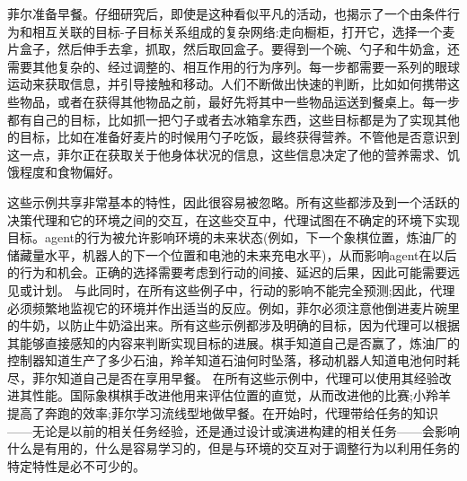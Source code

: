 菲尔准备早餐。仔细研究后，即使是这种看似平凡的活动，也揭示了一个由条件行为和相互关联的目标-子目标关系组成的复杂网络:走向橱柜，打开它，选择一个麦片盒子，然后伸手去拿，抓取，然后取回盒子。要得到一个碗、勺子和牛奶盒，还需要其他复杂的、经过调整的、相互作用的行为序列。每一步都需要一系列的眼球运动来获取信息，并引导接触和移动。人们不断做出快速的判断，比如如何携带这些物品，或者在获得其他物品之前，最好先将其中一些物品运送到餐桌上。每一步都有自己的目标，比如抓一把勺子或者去冰箱拿东西，这些目标都是为了实现其他的目标，比如在准备好麦片的时候用勺子吃饭，最终获得营养。不管他是否意识到这一点，菲尔正在获取关于他身体状况的信息，这些信息决定了他的营养需求、饥饿程度和食物偏好。

这些示例共享非常基本的特性，因此很容易被忽略。所有这些都涉及到一个活跃的决策代理和它的环境之间的交互，在这些交互中，代理试图在不确定的环境下实现目标。agent的行为被允许影响环境的未来状态(例如，下一个象棋位置，炼油厂的储藏量水平，机器人的下一个位置和电池的未来充电水平)，从而影响agent在以后的行为和机会。正确的选择需要考虑到行动的间接、延迟的后果，因此可能需要远见或计划。
与此同时，在所有这些例子中，行动的影响不能完全预测;因此，代理必须频繁地监视它的环境并作出适当的反应。例如，菲尔必须注意他倒进麦片碗里的牛奶，以防止牛奶溢出来。所有这些示例都涉及明确的目标，因为代理可以根据其能够直接感知的内容来判断实现目标的进展。棋手知道自己是否赢了，炼油厂的控制器知道生产了多少石油，羚羊知道石油何时坠落，移动机器人知道电池何时耗尽，菲尔知道自己是否在享用早餐。
在所有这些示例中，代理可以使用其经验改进其性能。国际象棋棋手改进他用来评估位置的直觉，从而改进他的比赛;小羚羊提高了奔跑的效率;菲尔学习流线型地做早餐。在开始时，代理带给任务的知识——无论是以前的相关任务经验，还是通过设计或演进构建的相关任务——会影响什么是有用的，什么是容易学习的，但是与环境的交互对于调整行为以利用任务的特定特性是必不可少的。



